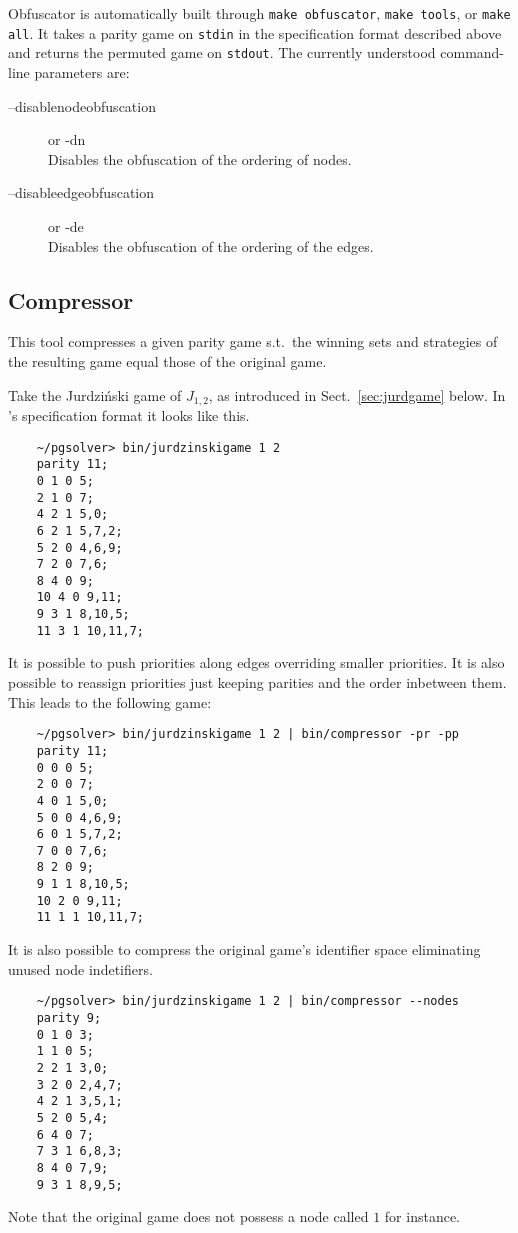 Obfuscator is automatically built through \verb#make obfuscator#,
\verb#make tools#, or \verb#make all#.
It takes a parity game on \texttt{stdin} in the specification format described above
and returns the permuted game on \texttt{stdout}. The currently understood command-line
parameters are:
\begin{description}
\item[{\ttfamily --disablenodeobfuscation}] \enspace or {\ttfamily -dn} \\
	Disables the obfuscation of the ordering of nodes.

\item[{\ttfamily --disableedgeobfuscation}] \enspace or {\ttfamily -de} \\
    Disables the obfuscation of the ordering of the edges.
\end{description}



\subsection{Compressor}

This tool compresses a given parity game s.t.\ the winning sets and strategies of
the resulting game equal those of the original game.

\begin{example}
Take the Jurdzi{\'n}ski game of $J_{1, 2}$, as introduced in Sect.~\ref{sec:jurdgame} below.
In \pgsolver's specification format it looks like this.
\begin{verbatim}
    ~/pgsolver> bin/jurdzinskigame 1 2
    parity 11;
    0 1 0 5;
    2 1 0 7;
    4 2 1 5,0;
    6 2 1 5,7,2;
    5 2 0 4,6,9;
    7 2 0 7,6;
    8 4 0 9;
    10 4 0 9,11;
    9 3 1 8,10,5;
    11 3 1 10,11,7;
\end{verbatim}
It is possible to push priorities along edges overriding smaller priorities. It is also possible
to reassign priorities just keeping parities and the order inbetween them. This leads to the
following game:
\begin{verbatim}
    ~/pgsolver> bin/jurdzinskigame 1 2 | bin/compressor -pr -pp
    parity 11;
    0 0 0 5;
    2 0 0 7;
    4 0 1 5,0;
    5 0 0 4,6,9;
    6 0 1 5,7,2;
    7 0 0 7,6;
    8 2 0 9;
    9 1 1 8,10,5;
    10 2 0 9,11;
    11 1 1 10,11,7;
\end{verbatim}
It is also possible to compress the original game's identifier space eliminating unused node indetifiers.
\begin{verbatim}
    ~/pgsolver> bin/jurdzinskigame 1 2 | bin/compressor --nodes
    parity 9;
    0 1 0 3;
    1 1 0 5;
    2 2 1 3,0;
    3 2 0 2,4,7;
    4 2 1 3,5,1;
    5 2 0 5,4;
    6 4 0 7;
    7 3 1 6,8,3;
    8 4 0 7,9;
    9 3 1 8,9,5;
\end{verbatim}
Note that the original game does not possess a node called $1$ for instance.
\end{example}

